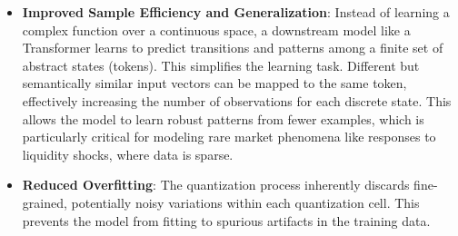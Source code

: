 \begin{itemize}
    \item \textbf{Improved Sample Efficiency and Generalization}: Instead of learning a complex function over a continuous space, a downstream model like a Transformer learns to predict transitions and patterns among a finite set of abstract states (tokens). This simplifies the learning task. Different but semantically similar input vectors can be mapped to the same token, effectively increasing the number of observations for each discrete state. This allows the model to learn robust patterns from fewer examples, which is particularly critical for modeling rare market phenomena like responses to liquidity shocks, where data is sparse.
    \item \textbf{Reduced Overfitting}: The quantization process inherently discards fine-grained, potentially noisy variations within each quantization cell. This prevents the model from fitting to spurious artifacts in the training data.
\end{itemize}

\begin{table}[h!]
\centering


\caption{거친 수준 서브토큰과 세밀한 수준 서브토큰의 코드북 사용률.}
\label{tab:codebook_usage}
\end{table}

\begin{table}[t!]
\centering

\caption{
    Trade-off analysis for factorizing a $k=20$ bit token into $n$ subtokens, based on the $\text{Kronos}_{base}$ architecture. The model's core Transformer blocks have $\approx$97.5M parameters.
}
\label{tab:factorization_analysis_revised}
\end{table}

